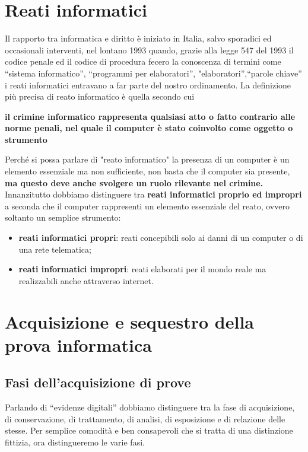 \chapter{Reati informatici}
Il rapporto tra informatica e diritto è iniziato in Italia, salvo sporadici ed occasionali interventi, nel lontano 1993 quando, grazie alla legge 547 del 1993 il codice penale ed
il codice di procedura fecero la conoscenza di termini come “sistema informatico”, “programmi per elaboratori”, "elaboratori”,“parole chiave” i reati informatici entravano a far parte del nostro ordinamento. 
La definizione più precisa di reato informatico è quella secondo cui 
\begin{center}
 \textbf{il crimine informatico rappresenta qualsiasi atto o fatto contrario alle norme penali, nel quale il computer è stato coinvolto come oggetto o strumento}   
\end{center}
Perché si possa parlare di "reato informatico" la presenza di un computer è un elemento essenziale ma non sufficiente, non basta che il computer sia presente, \textbf{ma questo deve anche svolgere un ruolo rilevante  nel crimine.} \\
Innanzitutto dobbiamo distinguere tra \textbf{reati informatici proprio ed impropri} a seconda che il computer rappresenti un elemento essenziale del reato, ovvero soltanto un semplice strumento:
\begin{itemize}
    \item \textbf{reati informatici propri}: reati concepibili solo ai danni di un computer o di una rete telematica;
    \item \textbf{reati informatici impropri}: reati elaborati per il mondo reale ma realizzabili anche attraverso internet.
\end{itemize}

\chapter{Acquisizione e sequestro della prova informatica}
\section{Fasi dell'acquisizione di prove }
Parlando di “evidenze digitali” dobbiamo distinguere tra la fase di acquisizione, di conservazione, di trattamento, di analisi, di esposizione e di relazione delle stesse. Per semplice comodità e ben consapevoli che si tratta di una distinzione fittizia, ora distingueremo le varie fasi. 

